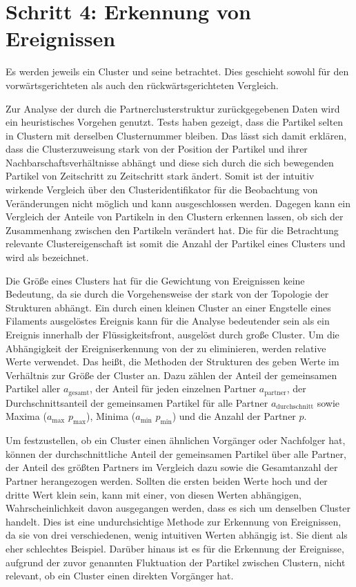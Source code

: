 \section{Schritt 4: Erkennung von Ereignissen}\label{sec:ereigniserkennung}

Es werden jeweils ein Cluster und seine  betrachtet. Dies geschieht sowohl für den vorwärtsgerichteten als auch den rückwärtsgerichteten Vergleich.

Zur Analyse der durch die Partnerclusterstruktur zurückgegebenen Daten wird ein heuristisches Vorgehen genutzt. Tests haben gezeigt, dass die Partikel selten in Clustern mit derselben Clusternummer bleiben. Das lässt sich damit erklären, dass die Clusterzuweisung stark von der Position der Partikel und ihrer Nachbarschaftsverhältnisse abhängt und diese sich durch die sich bewegenden Partikel von Zeitschritt zu Zeitschritt stark ändert. Somit ist der intuitiv wirkende Vergleich über den Clusteridentifikator für die Beobachtung von Veränderungen nicht möglich und kann ausgeschlossen werden. %
Dagegen kann ein Vergleich der Anteile von Partikeln in den Clustern erkennen lassen, ob sich der Zusammenhang zwischen den Partikeln verändert hat. Die für die Betrachtung relevante Clustereigenschaft ist somit die Anzahl der Partikel eines Clusters und wird als  bezeichnet.

Die Größe eines Clusters hat für die Gewichtung von Ereignissen keine Bedeutung, da sie durch die Vorgehensweise der \CFD stark von der Topologie der Strukturen abhängt. Ein durch einen kleinen Cluster an einer Engstelle eines Filaments ausgelöstes Ereignis kann für die Analyse bedeutender sein als ein Ereignis innerhalb der Flüssigkeitsfront, ausgelöst durch große Cluster. Um die Abhängigkeit der Ereigniserkennung von der  zu eliminieren, werden relative Werte verwendet. Das heißt, die Methoden der Strukturen des \SECC geben Werte im Verhältnis zur Größe der Cluster an. Dazu zählen der Anteil der gemeinsamen Partikel aller  $a_\text{gesamt}$, der Anteil für jeden einzelnen Partner $a_\text{partner}$, der Durchschnittsanteil der gemeinsamen Partikel für alle Partner $a_\text{durchschnitt}$ sowie Maxima ($a_\text{max}$ $p_\text{max}$), Minima ($a_\text{min}$ $p_\text{min}$) und die Anzahl der Partner $p$.

Um festzustellen, ob ein Cluster einen ähnlichen Vorgänger oder Nachfolger hat, können der durchschnittliche Anteil der gemeinsamen Partikel über alle Partner, der Anteil des größten Partners im Vergleich dazu sowie die Gesamtanzahl der Partner herangezogen werden. Sollten die ersten beiden Werte hoch und der dritte Wert klein sein, kann mit einer, von diesen Werten abhängigen, Wahrscheinlichkeit davon ausgegangen werden, dass es sich um denselben Cluster handelt. Dies ist eine undurchsichtige Methode zur Erkennung von Ereignissen, da sie von drei verschiedenen, wenig intuitiven Werten abhängig ist. Sie dient als eher schlechtes Beispiel. Darüber hinaus ist es für die Erkennung der Ereignisse, aufgrund der zuvor genannten Fluktuation der Partikel zwischen Clustern, nicht relevant, ob ein Cluster einen direkten Vorgänger hat.

